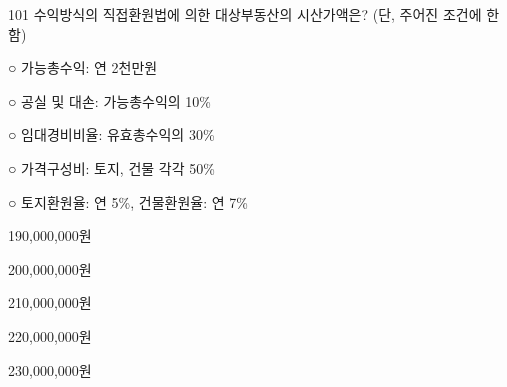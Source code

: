 \begin{question}{101}
수익방식의 직접환원법에 의한 대상부동산의 시산가액은? (단, 주어진 조건에 한함)
\begin{framedtext}
○ 가능총수익: 연 2천만원 \par
○ 공실 및 대손: 가능총수익의 10\% \par
○ 임대경비비율: 유효총수익의 30\% \par
○ 가격구성비: 토지, 건물 각각 50\% \par
○ 토지환원율: 연 5\%, 건물환원율: 연 7\%
\end{framedtext}
\begin{choices}
  \item 190,000,000원
  \item 200,000,000원
  \item 210,000,000원
  \item 220,000,000원
  \item 230,000,000원
\end{choices}
\end{question}
